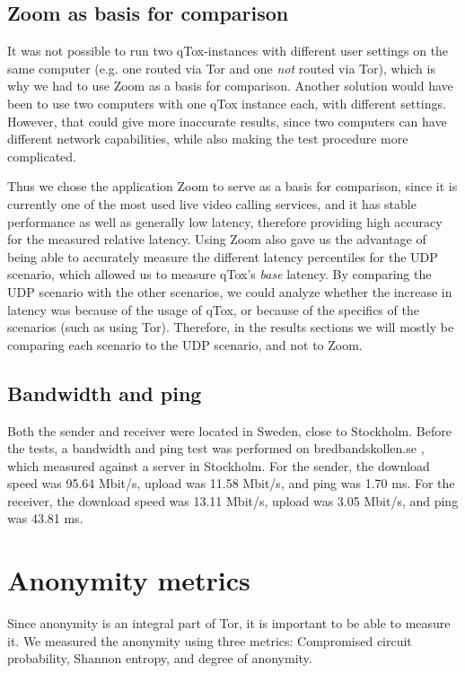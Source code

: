\documentclass{kththesis}
\begin{document}
\subsection{Zoom as basis for comparison}
It was not possible to run two qTox-instances with different user settings on the same computer (e.g. one routed via Tor and one \emph{not} routed via Tor), which is why we had to use Zoom as a basis for comparison. Another solution would have been to use two computers with one qTox instance each, with different settings. However, that could give more inaccurate results, since two computers can have different network capabilities, while also making the test procedure more complicated.

Thus we chose the application Zoom to serve as a basis for comparison, since it is currently one of the most used live video calling services, and it has stable performance as well as generally low latency, therefore providing high accuracy for the measured relative latency. Using Zoom also gave us the advantage of being able to accurately measure the different latency percentiles for the UDP scenario, which allowed us to measure qTox's \emph{base} latency. By comparing the UDP scenario with the other scenarios, we could analyze whether the increase in latency was because of the usage of qTox, or because of the specifics of the scenarios (such as using Tor). Therefore, in the results sections we will mostly be comparing each scenario to the UDP scenario, and not to Zoom.

\subsection{Bandwidth and ping}
Both the sender and receiver were located in Sweden, close to Stockholm. Before the tests, a bandwidth and ping test was performed on bredbandskollen.se \parencite{bredbandskollen}, which measured against a server in Stockholm. For the sender, the download speed was 95.64 Mbit/s, upload was 11.58 Mbit/s, and ping was 1.70 ms. For the receiver, the download speed was 13.11 Mbit/s, upload was 3.05 Mbit/s, and ping was 43.81 ms.

\section{Anonymity metrics}
\label{section:anonymityMetrics}
Since anonymity is an integral part of Tor, it is important to be able to measure it. We measured the anonymity using three metrics: Compromised circuit probability, Shannon entropy, and degree of anonymity.
\end{document}
